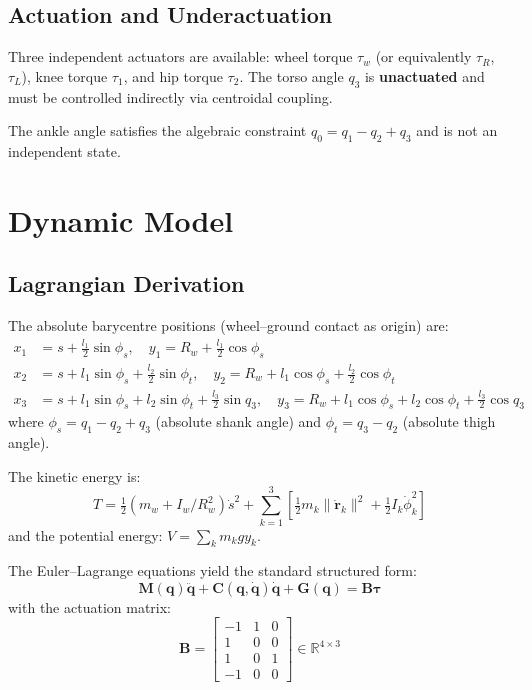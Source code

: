 \documentclass[11pt,a4paper]{article}
\newcommand{\bq}{\bm{q}}
\newcommand{\bdq}{\dot{\bm{q}}}
\newcommand{\bddq}{\ddot{\bm{q}}}
\newcommand{\btau}{\bm{\tau}}
\newcommand{\bM}{\bm{M}}
\newcommand{\bC}{\bm{C}}
\newcommand{\bG}{\bm{G}}
\newcommand{\bB}{\bm{B}}
\newcommand{\Real}{\mathbb{R}}
\begin{document}
\subsection{Actuation and Underactuation}

Three independent actuators are available: wheel torque $\tau_w$ (or equivalently $\tau_R$,
$\tau_L$), knee torque $\tau_1$, and hip torque $\tau_2$.  The torso angle $q_3$ is
\textbf{unactuated} and must be controlled indirectly via centroidal coupling.

The ankle angle satisfies the algebraic constraint $q_0 = q_1 - q_2 + q_3$ and is not an
independent state.


\section{Dynamic Model}
\label{sec:model}

\subsection{Lagrangian Derivation}

The absolute barycentre positions (wheel--ground contact as origin) are:
\begin{align}
    x_1 &= s + \tfrac{l_1}{2}\sin\phi_s, \quad
    y_1 = R_w + \tfrac{l_1}{2}\cos\phi_s \\[3pt]
    x_2 &= s + l_1\sin\phi_s + \tfrac{l_2}{2}\sin\phi_t, \quad
    y_2 = R_w + l_1\cos\phi_s + \tfrac{l_2}{2}\cos\phi_t \\[3pt]
    x_3 &= s + l_1\sin\phi_s + l_2\sin\phi_t + \tfrac{l_3}{2}\sin q_3, \quad
    y_3 = R_w + l_1\cos\phi_s + l_2\cos\phi_t + \tfrac{l_3}{2}\cos q_3
\end{align}
where $\phi_s = q_1 - q_2 + q_3$ (absolute shank angle) and $\phi_t = q_3 - q_2$ (absolute
thigh angle).

The kinetic energy is:
\begin{equation}
    T = \tfrac{1}{2}(m_w + I_w/R_w^2)\dot{s}^2 + \sum_{k=1}^{3}\!\left[\tfrac{1}{2}m_k
    \|\dot{\bm{r}}_k\|^2 + \tfrac{1}{2}I_k\dot{\phi}_k^2\right]
\end{equation}
and the potential energy: $V = \sum_k m_k g y_k$.

The Euler--Lagrange equations yield the standard structured form:
\begin{equation}
    \bM(\bq)\bddq + \bC(\bq,\bdq)\bdq + \bG(\bq) = \bB\btau
    \label{eq:eom}
\end{equation}
with the actuation matrix:
\begin{equation}
    \bB = \begin{bmatrix}
        -1 & 1 & 0 \\  1 & 0 & 0 \\  1 & 0 & 1 \\  -1 & 0 & 0
    \end{bmatrix} \in \Real^{4\times3}
\end{equation}
\end{document}
